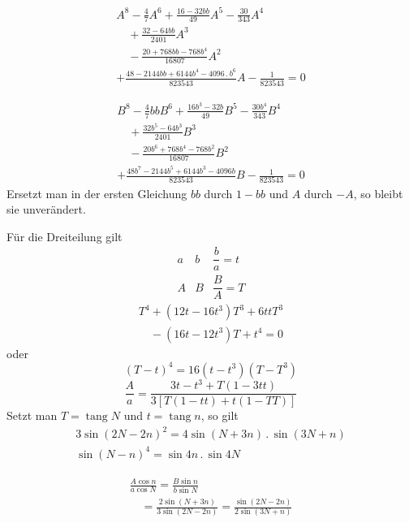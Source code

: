 \[
\begin{gathered}
A^8-\tfrac47A^6+\frac{16-32bb}{49}A^5-\frac{30}{343}A^4
\\[7pt]\quad{}+\frac{32-64bb}{2401}A^3
\\[7pt]\quad{}-\frac{20+768bb-768b^4}{16807}A^2\\[7pt]
+\frac{48-2144bb+6144b^4-4096\mathbin{.}b^6}{823543}A
-\frac1{823543}=0
\end{gathered}
\]

\[
\begin{gathered}
B^8-\tfrac47bbB^6+\frac{16b^3-32b}{49}B^5-\frac{30b^4}{343}B^4
\\[7pt]\quad{}+\frac{32b^5-64b^3}{2401}B^3
\\[7pt]\quad{}-\frac{20b^6+768b^4-768b^2}{16807}B^2\\[7pt]
+\frac{48b^7-2144b^5+6144b^3-4096b}{823543}B
-\frac1{823543}=0
\end{gathered}
\]
Ersetzt man in der ersten Gleichung $bb$ durch $1-bb$ und $A$ durch $-A$, so bleibt sie unverändert.


Für die Dreiteilung gilt
\[
\begin{array}{ccc}
a&b&\dfrac ba=t\\[5pt]
A&B&\dfrac BA=T
\end{array}
\]
\[
\begin{gathered}T^4+(12t-16t^3)T^3+6ttT^3\\[7pt]\quad{}-(16t-12t^3)T+t^4=0\end{gathered}
\]
oder
\[
(T-t)^4=16(t-t^3)(T-T^3)
\]
\[
\frac Aa=\frac{3t-t^3+T(1-3tt)}{3[T(1-tt)+t(1-TT)]}
\]
Setzt man $T=\operatorname{tang}N$ und $t=\operatorname{tang}n$, so gilt
\[
\begin{gathered}
3\sin(2N-2n)^2=4\sin(N+3n)\mathbin{.}\sin(3N+n)\\[7pt]
\sin(N-n)^4=\sin4n\mathbin{.}\sin4N
\end{gathered}
\]

\[
\begin{gathered}\frac{A\cos n}{a\cos N}=\frac{B\sin n}{b\sin N}
\\[7pt]\quad{}=\frac{2\sin(N+3n)}{3\sin(2N-2n)}
=\frac{\sin(2N-2n)}{2\sin(3N+n)}\end{gathered}
\]

\clearpage
\endgroup
